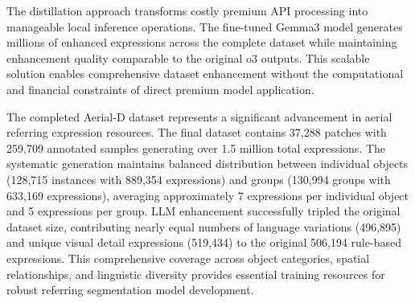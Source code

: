 The distillation approach transforms costly premium API processing into manageable local inference operations. The fine-tuned Gemma3 model generates millions of enhanced expressions across the complete dataset while maintaining enhancement quality comparable to the original o3 outputs. This scalable solution enables comprehensive dataset enhancement without the computational and financial constraints of direct premium model application.

The completed Aerial-D dataset represents a significant advancement in aerial referring expression resources. The final dataset contains 37,288 patches with 259,709 annotated samples generating over 1.5 million total expressions. The systematic generation maintains balanced distribution between individual objects (128,715 instances with 889,354 expressions) and groups (130,994 groups with 633,169 expressions), averaging approximately 7 expressions per individual object and 5 expressions per group. LLM enhancement successfully tripled the original dataset size, contributing nearly equal numbers of language variations (496,895) and unique visual detail expressions (519,434) to the original 506,194 rule-based expressions. This comprehensive coverage across object categories, spatial relationships, and linguistic diversity provides essential training resources for robust referring segmentation model development.

